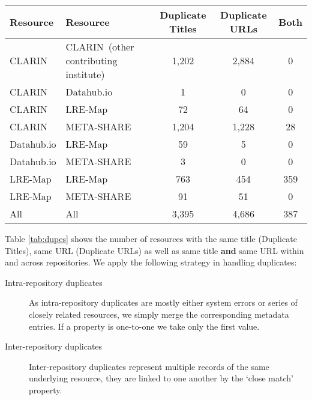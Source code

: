 \documentclass[11pt]{article}
\begin{document}
\begin{table*}
    \begin{center}
        \begin{tabular}{ll|ccc}
        Resource    & Resource    & Duplicate Titles & Duplicate URLs & Both \\
        \hline                                                                  
        CLARIN      & CLARIN{\tiny~(other contributing institute)}      & 1,202            & 2,884          & 0    \\
        CLARIN      & Datahub.io  & 1                & 0              & 0    \\
        CLARIN      & LRE-Map     & 72               & 64             & 0    \\
        CLARIN      & META-SHARE  & 1,204            & 1,228          & 28    \\
        Datahub.io  & LRE-Map     & 59               & 5              & 0    \\
        Datahub.io  & META-SHARE  & 3                & 0              & 0    \\
        LRE-Map     & LRE-Map     & 763              & 454            & 359  \\
        LRE-Map     & META-SHARE  & 91               & 51             & 0    \\
        \hline
        All         & All         & 3,395            & 4,686          & 387  \\
        \end{tabular}
    \end{center}
    \caption{\label{tab:dupes}Number of duplicate inter-repository records by type}
\end{table*}

Table \ref{tab:dupes} shows the number of resources with the same title
(Duplicate Titles), same URL (Duplicate URLs) as well as same title \textbf{and}
same URL within and across repositories.  We apply the following strategy in
handling duplicates:

\begin{description}
    \item[Intra-repository duplicates] As intra-repository duplicates are
        mostly either system errors or series of closely related resources, we
        simply merge the corresponding metadata entries. If a property is one-to-one we take only the
        first value.
    \item[Inter-repository duplicates] Inter-repository duplicates represent
        multiple records of the same underlying resource, they are linked to one
        another by the `close match' property.
\end{description}
\end{document}
